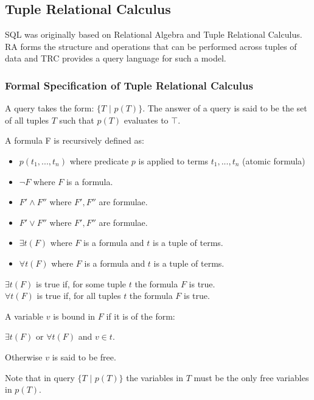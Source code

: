 \documentclass[a4paper, 11pt]{article}
\begin{document}
  \subsection{Tuple Relational Calculus}
    SQL was originally based on Relational Algebra and Tuple Relational
    Calculus. RA forms the structure and operations that can be performed
    across tuples of data and TRC provides a query language for such a model.

    \subsubsection{Formal Specification of Tuple Relational Calculus\cite{lecRA}}
      \label{sec:formalTRC}
      A query takes the form: $\{T\text{ | }p(T)\}$. The answer of a query is
      said to be the set of all tuples $T$ such that $p(T)$ evaluates to $\top$.

      A formula F is recursively defined as:
      \begin{itemize}
        \item $p(t_1, ..., t_n)$ where predicate $p$ is applied to terms $t_1, ..., t_n$ (atomic formula)
        \item $\lnot F$ where $F$ is a formula.
        \item $F' \land F''$ where $F', F''$ are formulae.
        \item $F' \lor F''$ where $F', F''$ are formulae.
        \item $\exists t(F)$ where $F$ is a formula and $t$ is a tuple of terms.
        \item $\forall t(F)$ where $F$ is a formula and $t$ is a tuple of terms.
      \end{itemize}

      $\exists t(F)$ is true if, for some tuple $t$ the formula $F$ is true. \\
      $\forall t(F)$ is true if, for all tuples $t$ the formula $F$ is true.

      A variable $v$ is bound in $F$ if it is of the form:

      $\exists t(F)$ or $\forall t(F)$ and $v \in t$.

      Otherwise $v$ is said to be free.

      Note that in query $\{T\text{ | }p(T)\}$ the variables in $T$ must be the only
      free variables in $p(T)$.
\end{document}
